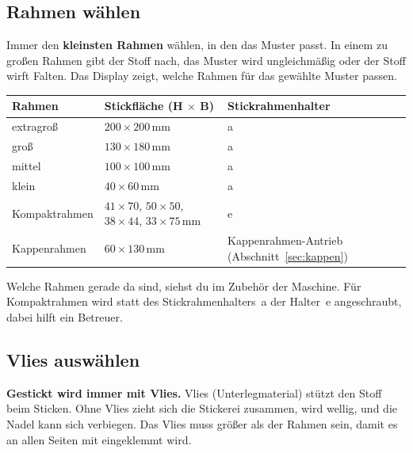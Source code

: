 \documentclass{\basedir/fablab-document}
\begin{document}
	\subsection{Rahmen wählen}
	\label{sec:rahmen}
	Immer den \textbf{kleinsten Rahmen} wählen, in den das Muster passt. In einem zu großen Rahmen gibt der Stoff nach, das Muster wird ungleichmäßig oder der Stoff wirft Falten. Das Display zeigt, welche Rahmen für das gewählte Muster passen.

	\begin{center}
		\small
		\renewcommand{\arraystretch}{1.25}
		\begin{tabular}{|l|l|l|}
			\hline
			\textbf{Rahmen} & \textbf{Stickfläche (H $\times$ B)} & \textbf{Stickrahmenhalter} \\ \hline
			extragroß & $200 \times 200$\,mm & a \\ \hline
			groß & $130 \times 180$\,mm & a \\ \hline
			mittel & $100 \times 100$\,mm & a \\ \hline
			klein & $40 \times 60$\,mm & a \\ \hline
			Kompaktrahmen & $41 \times 70$, $50 \times 50$, $38 \times 44$, $33 \times 75$\,mm & e \\ \hline
			Kappenrahmen & $60 \times 130$\,mm & Kappenrahmen-Antrieb (Abschnitt~\ref{sec:kappen}) \\ \hline
		\end{tabular}
	\end{center}
	Welche Rahmen gerade da sind, siehst du im Zubehör der Maschine. Für Kompaktrahmen wird statt des Stickrahmenhalters~a der Halter~e angeschraubt, dabei hilft ein Betreuer.

	\subsection{Vlies auswählen}
	\label{sec:vlies}
	\textbf{Gestickt wird immer mit Vlies.} Vlies (Unterlegmaterial) stützt den Stoff beim Sticken. Ohne Vlies zieht sich die Stickerei zusammen, wird wellig, und die Nadel kann sich verbiegen. Das Vlies muss größer als der Rahmen sein, damit es an allen Seiten mit eingeklemmt wird.
\end{document}
